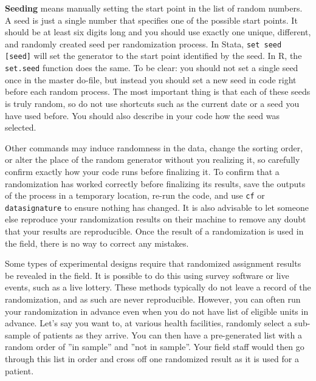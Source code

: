 \textbf{Seeding} means manually setting the start point in the list of random numbers.
A seed is just a single number that specifies one of the possible start points.
It should be at least six digits long and you should use exactly
one unique, different, and randomly created seed per randomization process.
In Stata, \texttt{set seed [seed]} will set the generator
to the start point identified by the seed.
In R, the \texttt{set.seed} function does the same.
To be clear: you should not set a single seed once in the master do-file,
but instead you should set a new seed in code right before each random process.
The most important thing is that each of these seeds is truly random,
so do not use shortcuts such as the current date or a seed you have used before.
You should also describe in your code how the seed was selected.

Other commands may induce randomness in the data,
change the sorting order,
or alter the place of the random generator without you realizing it,
so carefully confirm exactly how your code runs before finalizing it.
To confirm that a randomization has worked correctly before finalizing its results,
save the outputs of the process in a temporary location,
re-run the code, and use \texttt{cf} or \texttt{datasignature} to ensure
nothing has changed. It is also advisable to let someone else reproduce your
randomization results on their machine to remove any doubt that your results
are reproducible.
Once the result of a randomization is used in the field,
there is no way to correct any mistakes.


Some types of experimental designs require
that randomized assignment results be revealed in the field.
It is possible to do this using survey software or live events, such as a live lottery.
These methods typically do not leave a record of the randomization,
and as such are never reproducible. 
However, you can often run your randomization in advance 
even when you do not have list of eligible units in advance.
Let's say you want to, at various health facilities, 
randomly select a sub-sample of patients as they arrive.
You can then have a pre-generated list 
with a random order of ''in sample'' and ''not in sample''.
Your field staff would then go through this list in order
and cross off one randomized result as it is used for a patient.


